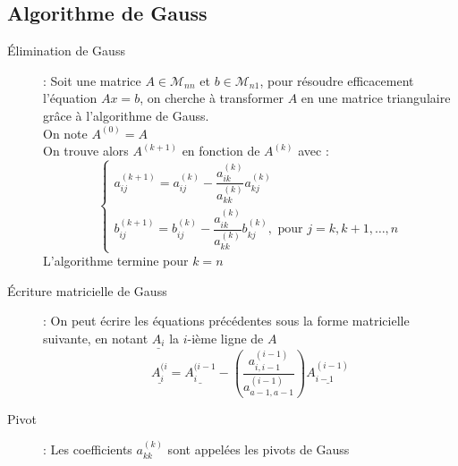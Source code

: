 \subsection{Algorithme de Gauss}
\begin{description}
\item[Élimination de Gauss] : Soit une matrice $A\in\mathcal M_{nn}$ et $b\in\mathcal M_{n1}$, pour résoudre efficacement l'équation $Ax=b$, on cherche à transformer $A$ en une matrice triangulaire grâce à l'algorithme de Gauss.\\
    On note $A^{(0)}=A$\\
    On trouve alors $A^{(k+1)}$ en fonction de $A^{(k)}$ avec :
    \[
        \begin{cases}
            a_{ij}^{(k+1)}=a_{ij}^{(k)}-\dfrac{a_{ik}^{(k)}}{a_{kk}^{(k)}}a_{kj}^{(k)}\\
            b_{ij}^{(k+1)}=b_{ij}^{(k)}-\dfrac{a_{ik}^{(k)}}{a_{kk}^{(k)}}b_{kj}^{(k)}, \textrm{ pour } j=k,k+1,\dots,n
        \end{cases}
    \]
    L'algorithme termine pour $k=n$
\item[Écriture matricielle de Gauss] : On peut écrire les équations précédentes sous la forme matricielle suivante, en notant $\underline{A_i}$ la $i$-ième ligne de $A$
    \[
        \underline{A_i^{(i}}=\underline{A_i^{(i-1}}-\left(
            \dfrac{a_{i,i-1}^{(i-1)}}{a_{a-1,a-1}^{(i-1)}}
        \right)
        \underline{A_{i-1}^{(i-1)}}
    \]
\item[Pivot] : Les coefficients $a_{kk}^{(k)}$ sont appelées les pivots de Gauss
\end{description}
